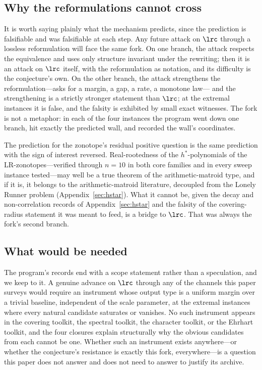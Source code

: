 \subsection{Why the reformulations cannot cross}

It is worth saying plainly what the mechanism predicts, since the
prediction is falsifiable and was falsifiable at each step. Any future
attack on $\lrc$ through a lossless reformulation will face the same
fork. On one branch, the attack respects the equivalence and uses only
structure invariant under the rewriting; then it is an attack on
$\lrc$ itself, with the reformulation as notation, and its difficulty
is the conjecture's own. On the other branch, the attack strengthens
the reformulation---asks for a margin, a gap, a rate, a monotone law---
and the strengthening is a strictly stronger statement than $\lrc$;
at the extremal instances it is false, and the falsity is exhibited by
small exact witnesses. The fork is not a metaphor: in each of the four
instances the program went down one branch, hit exactly the predicted
wall, and recorded the wall's coordinates.

The prediction for the zonotope's residual positive question is the same
prediction with the sign of interest reversed. Real-rootedness of the
$h^*$-polynomials of the LR-zonotopes---verified through $n=10$ in both
core families and in every sweep instance tested---may well be a true
theorem of the arithmetic-matroid type, and if it is, it belongs to the
arithmetic-matroid literature, decoupled from the Lonely Runner problem
(Appendix~\ref{sec:hstar}). What it cannot be, given the decay and
non-correlation records of Appendix~\ref{sec:hstar} and the falsity of
the covering-radius statement it was meant to feed, is a bridge to
$\lrc$. That was always the fork's second branch.

\subsection{What would be needed}

The program's records end with a scope statement rather than a
speculation, and we keep to it. A genuine advance on $\lrc$ through any
of the channels this paper surveys would require an instrument whose
output type is a uniform margin over a trivial baseline, independent of
the scale parameter, at the extremal instances where every natural
candidate saturates or vanishes. No such instrument appears in the
covering toolkit, the spectral toolkit, the character toolkit, or the
Ehrhart toolkit, and the four closures explain structurally why the
obvious candidates from each cannot be one. Whether such an instrument
exists anywhere---or whether the conjecture's resistance is exactly this
fork, everywhere---is a question this paper does not answer and does
not need to answer to justify its archive.

